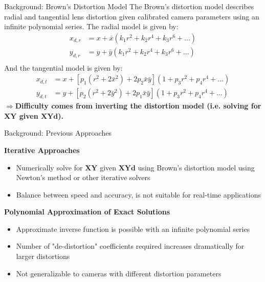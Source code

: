 \documentclass[final]{beamer}
\newlength{\colwidth}
\begin{document}
\begin{frame}[t]
\begin{columns}[t]
\begin{column}{\colwidth}
      \begin{block}{Background: Brown's Distortion Model}
        The Brown's distortion model describes radial and tangential lens distortion given calibrated camera parameters using an infinite polynomial series. The radial model is given by:
        \begin{align*}
          x_{d,r} & = x + \bar{x} \left( k_1 r^2 + k_2 r^4 + k_3 r^6 + ... \right) \\
          y_{d,r} & = y + \bar{y} \left( k_1 r^2 + k_2 r^4 + k_3 r^6 + ... \right) \\
        \end{align*}
        And the tangential model is given by:
        \begin{align*}
          x_{d,t} & = x + \left[p_1 (r^2 + 2 \bar{x}^2) + 2 p_2 \bar{x} \bar{y}\right] \left(1 + p_3 r^2 + p_4 r^4 + ...\right) \\
          y_{d,t} & = y + \left[p_2 (r^2 + 2 \bar{y}^2) + 2 p_1 \bar{x} \bar{y}\right]\left(1 + p_3 r^2 + p_4 r^4 + ...\right)
        \end{align*}
        $\Rightarrow$\textbf{Difficulty comes from inverting the distortion model (i.e. solving for $\mathbf{XY}$ given $\mathbf{XYd}$).}
      \end{block}

      \begin{block}{Background: Previous Approaches}

        \textbf{Iterative Approaches} \cite{villiers_centi-pixel_2008}
        \begin{itemize}
          \item Numerically solve for $\mathbf{XY}$ given $\mathbf{XYd}$ using Brown's distortion model using Newton's method or other iterative solvers
          \item Balance between speed and accuracy, is not suitable for real-time applications
        \end{itemize}

        \textbf{Polynomial Approximation of Exact Solutions} \cite{drap_exact_2016}
        \begin{itemize}
          \item Approximate inverse function is possible with an infinite polynomial series
          \item Number of "de-distortion" coefficients required increases dramatically for larger distortions
          \item Not generalizable to cameras with different distortion parameters
        \end{itemize}


\end{block}
\end{column}
\end{columns}
\end{frame}
\end{document}
